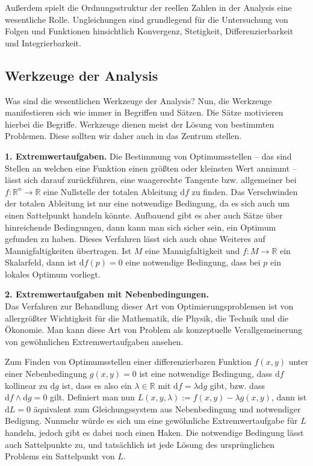 \documentclass[a4paper,10pt,fleqn,twocolumn,twoside]{scrartcl}
\newcommand{\R}{\mathbb R}
\newcommand{\strong}[1]{\textsf{\textbf{#1}}}
\begin{document}
Außerdem spielt die Ordnungsstruktur der reellen Zahlen in der
Analysis eine wesentliche Rolle. Ungleichungen sind grundlegend
für die Untersuchung von Folgen und Funktionen hinsichtlich
Konvergenz, Stetigkeit, Differenzierbarkeit und Integrierbarkeit.

\subsection{Werkzeuge der Analysis}

Was sind die wesentlichen Werkzeuge der Analysis? Nun, die Werkzeuge
manifestieren sich wie immer in Begriffen und Sätzen. Die Sätze
motivieren hierbei die Begriffe. Werkzeuge dienen meist der Lösung
von bestimmten Problemen. Diese sollten wir daher auch in das Zentrum
stellen.

\strong{1. Extremwertaufgaben.} Die Bestimmung von Optimumsstellen
-- das sind Stellen an welchen eine Funktion einen größten oder
kleinsten Wert annimmt -- lässt sich darauf zurückführen, eine
waagerechte Tangente bzw. allgemeiner bei $f\colon\R^n\to\R$ eine
Nullstelle der totalen Ableitung $\mathrm df$ zu finden. Das
Verschwinden der totalen Ableitung ist nur eine notwendige Bedingung,
da es sich auch um einen Sattelpunkt handeln könnte. Aufbauend
gibt es aber auch Sätze über hinreichende Bedingungen, dann kann man
sich sicher sein, ein Optimum gefunden zu haben. Dieses Verfahren
lässt sich auch ohne Weiteres auf Mannigfaltigkeiten übertragen.
Ist $M$ eine Mannigfaltigkeit und $f\colon M\to\R$ ein Skalarfeld,
dann ist $\mathrm df(p)=0$ eine notwendige Bedingung, dass bei $p$
ein lokales Optimum vorliegt.

\strong{2. Extremwertaufgaben mit Nebenbedingungen.}\\
Das Verfahren zur Behandlung dieser Art von Optimierungsproblemen
ist von allergrößter Wichtigkeit für die Mathematik, die Physik,
die Technik und die Ökonomie. Man kann diese Art von Problem als
konzeptuelle Verallgemeinerung von gewöhnlichen Extremwertaufgaben
ansehen.

Zum Finden von Optimumsstellen einer differenzierbaren Funktion
$f(x,y)$ unter einer Nebenbedingung $g(x,y)=0$ ist eine notwendige
Bedingung, dass $\mathrm df$ kollinear zu $\mathrm dg$ ist, dass
es also ein $\lambda\in\R$ mit $\mathrm df = \lambda\mathrm dg$
gibt, bzw. dass $\mathrm df\wedge\mathrm dg=0$ gilt. Definiert
man nun $L(x,y,\lambda):=f(x,y)-\lambda g(x,y)$, dann ist
$\mathrm dL=0$ äquivalent zum Gleichungssystem aus Nebenbedingung
und notwendiger Bedigung. Nunmehr würde es sich um eine
gewöhnliche Extremwertaufgabe für $L$ handeln, jedoch gibt
es dabei noch einen Haken. Die notwendige Bedingung lässt auch
Sattelpunkte zu, und tatsächlich ist jede Lösung des ursprünglichen
Problems ein Sattelpunkt von $L$.
\end{document}

